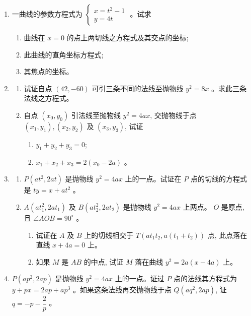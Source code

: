 \documentclass[10pt]{article}
\begin{document}
\begin{enumerate}
  \item 一曲线的参数方程式为 $\left\{\begin{array}{l}x=t^{2}-1 \\ y=4 t\end{array}\right.$ 。试求
  \begin{enumerate}
    \item 曲线在 $x=0$ 的点上两切线之方程式及其交点的坐标;
    \item 此曲线的直角坐标方程式;
    \item 其焦点的坐标。
  \end{enumerate}

  \item \begin{enumerate}
  \item 试证自点 $(42,-60)$ 可引三条不同的法线至抛物线 $y^{2}=8 x$ 。求此三条法线之方程式。

  \item 自点 $\left(x_{0}, y_{0}\right)$ 引法线至抛物线 $y^{2}=4 a x$, 交抛物线于点 $\left(x_{1}, y_{1}\right),\left(x_{2}, y_{2}\right)$ 及 $\left(x_{3}, y_{3}\right)$, 试证
  \begin{enumerate}
    \item $y_{1}+y_{2}+y_{3}=0$;
    \item $x_{1}+x_{2}+x_{3}=2\left(x_{0}-2 a\right)$ 。
  \end{enumerate}
 \end{enumerate}

  \item \begin{enumerate}
    \item $P\left(a t^{2}, 2 a t\right)$ 是抛物线 $y^{2}=4 a x$ 上的一点。试证在 $P$ 点的切线的方程式是 $t y=x+a t^{2}$ 。

    \item $A\left(a t_{1}^{2}, 2 a t_{1}\right)$ 及 $B\left(a t_{2}^{2}, 2 a t_{2}\right)$ 是抛物线 $y^{2}=4 a x$ 上两点。 $O$ 是原点, 且 $\angle AOB=90^{\circ}$ 。
    \begin{enumerate}
      \item 试证在 $A$ 及 $B$ 上的切线相交于 $T\left(a t_{1} t_{2}, a\left(t_{1}+t_{2}\right)\right)$ 点, 此点落在直线 $x+4 a=0$ 上。
      \item 如果 $M$ 是 $AB$ 的中点, 试证 $M$ 落在曲线 $y^{2}=2 a(x-4 a)$ 上。
    \end{enumerate}
  \end{enumerate}

  \item $P\left(a p^{2}, 2 a p\right)$ 是抛物线 $y^{2}=4 a x$ 上的一点。证过 $P$ 点的法线其方程式为 $y+p x=2 a p+a p^{3}$ 。如果这条法线再交抛物线于点 $Q\left(a q^{2}, 2 a p\right)$, 证 $q=-p-\dfrac{2}{p}$ 。


\end{enumerate}
\end{document}
